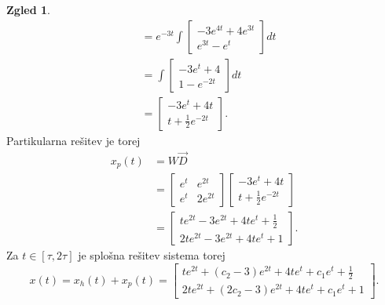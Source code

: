 \documentclass[12pt,a4paper]{amsart}
\theoremstyle{definition} %
\newtheorem{zgled}[definicija]{Zgled}
\theoremstyle{plain} %
\begin{document}
\begin{zgled}
\begin{equation*}
\begin{split}
                    &= e^{-3t}\int \begin{bmatrix}
                        -3e^{4t}+4e^{3t}  \\
                        e^{3t}-e^t  
                    \end{bmatrix} dt \\
                    &= \int \begin{bmatrix}
                        -3e^{t}+4  \\
                        1-e^{-2t}  
                    \end{bmatrix} dt \\
                    &= \begin{bmatrix}
                        -3e^t+4t  \\
                        t+\frac{1}{2}e^{-2t}  
                    \end{bmatrix}.
        \end{split}
    \end{equation*}
    Partikularna rešitev je torej 
    \begin{equation*}
        \begin{split}
            x_p(t) &= W\vec{D} \\
                    &= \begin{bmatrix}
                        e^t & e^{2t} \\
                        e^t & 2e^{2t} 
                    \end{bmatrix} \begin{bmatrix}
                        -3e^t+4t  \\
                        t+\frac{1}{2}e^{-2t}  
                    \end{bmatrix} \\
                    &= \begin{bmatrix}
                        te^{2t}-3e^{2t}+4te^t+\frac{1}{2}  \\
                        2te^{2t}-3e^{2t}+4te^{t}+1 
                    \end{bmatrix}.
        \end{split}
    \end{equation*}
    Za $t\in[\tau,2\tau]$ je splošna rešitev sistema torej
    \[x(t)=x_h(t)+x_p(t)=\begin{bmatrix}
        te^{2t}+(c_2-3)e^{2t}+4te^t+c_1e^t+\frac{1}{2}  \\
        2te^{2t}+(2c_2-3)e^{2t}+4te^{t}+c_1e^t+1 
    \end{bmatrix}.\]

\end{zgled}
\end{document}
